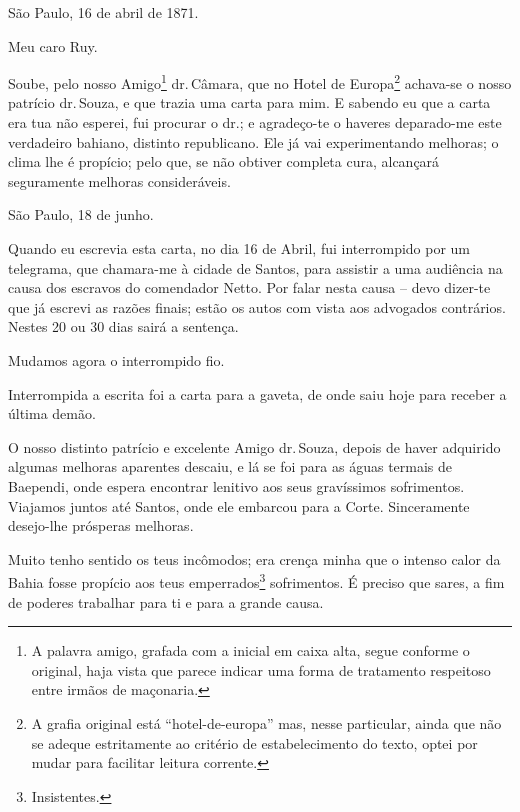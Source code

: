 São Paulo, 16 de abril de 1871.

Meu caro Ruy.

Soube, pelo nosso Amigo\footnote{ A palavra amigo, grafada com a
  inicial em caixa alta, segue conforme o original, haja vista que
  parece indicar uma forma de tratamento respeitoso entre irmãos de
  maçonaria.} dr.\,Câmara, que no Hotel de Europa\footnote{ A grafia
  original está ``hotel-de-europa'' mas, nesse particular, ainda que não
  se adeque estritamente ao critério de estabelecimento do texto, optei
  por mudar para facilitar leitura corrente.} achava-se o nosso patrício
dr.\,Souza, e que trazia uma carta para mim. E sabendo eu que a carta era
tua não esperei, fui procurar o dr.; e agradeço-te o haveres deparado-me
este verdadeiro bahiano, distinto republicano. Ele já vai experimentando
melhoras; o clima lhe é propício; pelo que, se não obtiver completa
cura, alcançará seguramente melhoras consideráveis.

São Paulo, 18 de junho.

Quando eu escrevia esta carta, no dia 16 de Abril, fui interrompido por
um telegrama, que chamara-me à cidade de Santos, para assistir a uma
audiência na causa dos escravos do comendador Netto. Por falar nesta
causa -- devo dizer-te que já escrevi as razões finais; estão os autos
com vista aos advogados contrários. Nestes 20 ou 30 dias sairá a
sentença.

Mudamos agora o interrompido fio.

Interrompida a escrita foi a carta {para a gaveta}, de onde saiu hoje
para receber a última demão.

O nosso distinto patrício e excelente Amigo dr.\,Souza, depois de haver
adquirido algumas melhoras aparentes descaiu, e lá se foi para as águas
termais de Baependi, onde espera encontrar lenitivo aos seus gravíssimos
sofrimentos. Viajamos juntos até Santos, onde ele embarcou para a Corte.
Sinceramente desejo-lhe prósperas melhoras.

Muito tenho sentido os teus incômodos; era crença minha que o intenso
calor da Bahia fosse propício aos teus emperrados\footnote{
  Insistentes.} sofrimentos. É preciso que sares, a fim de poderes
trabalhar para ti e para a grande causa.

